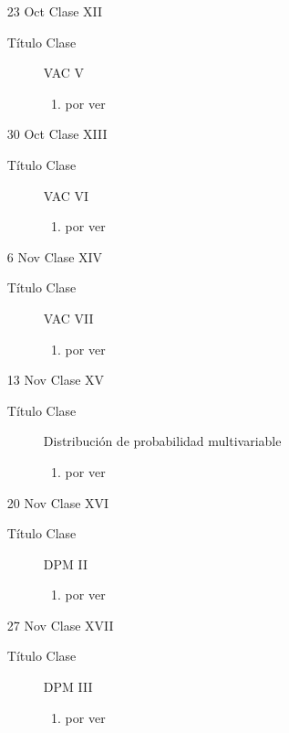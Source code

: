 \documentclass[letterpaper,12pt]{article}
\begin{document}
\begin{itemize}
  \item[23 Oct] Clase XII
  \begin{description}
  \item[Título Clase] VAC V
  \begin{enumerate}
  \item por ver
  \end{enumerate}
  \end{description}  
  
  \item[30 Oct] Clase XIII
  \begin{description}
  \item[Título Clase] VAC VI
  \begin{enumerate}
  \item por ver
  \end{enumerate}
  \end{description}
  
  \item[6 Nov] Clase XIV
  \begin{description}
  \item[Título Clase] VAC VII
  \begin{enumerate}
  \item por ver
  \end{enumerate}
  \end{description}  
    
  \item[13 Nov] Clase XV
  \begin{description}
  \item[Título Clase] Distribución de probabilidad multivariable
  \begin{enumerate}
  \item por ver
  \end{enumerate}
  \end{description}
  
  \item[20 Nov] Clase XVI
  \begin{description}
  \item[Título Clase] DPM II
  \begin{enumerate}
  \item por ver
  \end{enumerate}
  \end{description}
    
  \item[27 Nov] Clase XVII
  \begin{description}
  \item[Título Clase] DPM III
  \begin{enumerate}
  \item por ver
  \end{enumerate}
  \end{description}
  

\end{itemize}
\end{document}
